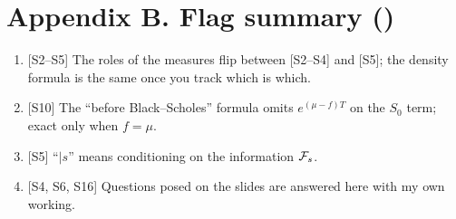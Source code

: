 \documentclass[10pt]{article}
\begin{document}
\section*{Appendix B. Flag summary (\flag)}
\begin{enumerate}
\item {}[S2--S5] The roles of the measures flip between [S2--S4] and [S5]; the density formula is the same once you track which is which.
\item {}[S10] The ``before Black--Scholes'' formula omits $e^{(\mu-f)T}$ on the $S_0$ term; exact only when $f=\mu$.
\item {}[S5] ``$\mid s$'' means conditioning on the information $\mathcal{F}_s$.
\item {}[S4, S6, S16] Questions posed on the slides are answered here with my own working.
\end{enumerate}
\end{document}
